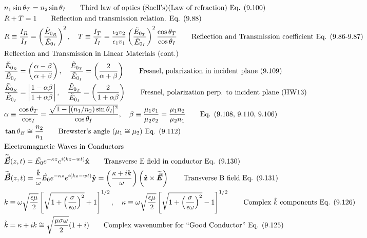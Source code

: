 \documentclass[10pt]{article}
\newcommand{\xhat}{\boldsymbol{\hat{\textbf{x}}}}
\newcommand{\yhat}{\boldsymbol{\hat{\textbf{y}}}}
\newcommand{\zhat}{\boldsymbol{\hat{\textbf{z}}}}
\newcommand{\vect}[1]{\boldsymbol{\vec{#1}}}
\newcommand{\wt}[1]{\widetilde{#1}}
\newcommand{\ce}{\wt{\vect{E}}}
\newcommand{\cb}{\wt{\vect{B}}}
\begin{document}
\begin{align*}
& n_1 \sin \theta_T = n_2\sin \theta_I \tag*{Third law of optics (Snell's)(Law of refraction) Eq. (9.100)}\\
& R + T = 1 \tag*{Reflection and transmission relation. Eq. (9.88)}\\
& R \equiv \frac{I_R}{I_I}  =  \left( \frac{\tilde{E}_{0_R}}{\tilde{E}_{0_I}} \right)^2, \quad T \equiv \frac{I_T}{I_I} = \frac{\epsilon_2 v_2}{\epsilon_1 v_1}\left( \frac{\tilde{E}_{0_T}}{\tilde{E}_{0_I}} \right)^2 \frac{\cos \theta_T}{\cos \theta_I} \tag*{Reflection and Transmission coefficient Eq. (9.86-9.87)} \\
\intertext{Reflection and Transmission in Linear Materials (cont.)}
& \frac{\tilde{E}_{0_R}}{\tilde{E}_{0_I}} = \left( \frac{\alpha - \beta}{\alpha + \beta} \right), \quad \frac{\tilde{E}_{0_T}}{\tilde{E}_{0_I}} = \left( \frac{2}{\alpha + \beta}\right) \tag*{Fresnel, polarization in incident plane  (9.109)}\\
&\frac{\tilde{E}_{0_R}}{\tilde{E}_{0_I}} = \left| \frac{1-\alpha\beta}{1+\alpha\beta} \right|, \quad \frac{\tilde{E}_{0_T}}{\tilde{E}_{0_I}} = \left( \frac{2}{1+\alpha\beta} \right) \tag*{Fresnel, polarization perp. to incident plane (HW13)}\\
& \alpha \equiv \frac{\cos \theta_T}{\cos_I} = \frac{\sqrt{1 - [(n_1/n_2)\sin\theta_I]^2}}{\cos\theta_I}, \quad \beta \equiv \frac{\mu_1 v_1}{\mu_2 v_2} = \frac{\mu_1 n_2}{\mu_2 n_1}	\tag*{Eq. (9.108, 9.110, 9.106)}\\
&\tan \theta_B \cong \frac{n_2}{n_1} \tag*{Brewster's angle $(\mu_1 \cong \mu_2)$ Eq. (9.112)}\\
\intertext{Electromagnetic Waves in Conductors}
&\ce(z, t) = \tilde{E_0}e^{-\kappa z}e^{i(kz-wt)} \xhat \tag*{Transverse E field in conductor Eq. (9.130)} \\
&\cb(z, t) = \frac{\tilde{k}}{\omega} \tilde{E_0}e^{-\kappa z}e^{i(kz-wt)} \yhat = \left( \frac{\kappa + ik}{\omega}\right) \left(\zhat \times \ce\right)  \tag*{Transverse B field Eq. (9.131)}\\
& k \equiv \omega \sqrt{\frac{\epsilon \mu}{2}}\left[ \sqrt{1 + \left(\frac{\sigma}{\epsilon \omega}\right)^2} + 1  \right]^{1/2}, \quad \kappa \equiv \omega \sqrt{\frac{\epsilon \mu}{2}}\left[ \sqrt{1 + \left(\frac{\sigma}{\epsilon \omega}\right)^2} - 1 \right]^{1/2} \tag*{Complex $\tilde{k}$ components Eq. (9.126)} \\
& \tilde{k} = \kappa + ik \cong \sqrt{\frac{\mu \sigma \omega}{2}}(1+i) \tag*{Complex wavenumber for ``Good Conductor'' Eq. (9.125)}\\

\end{align*}
\end{document}
